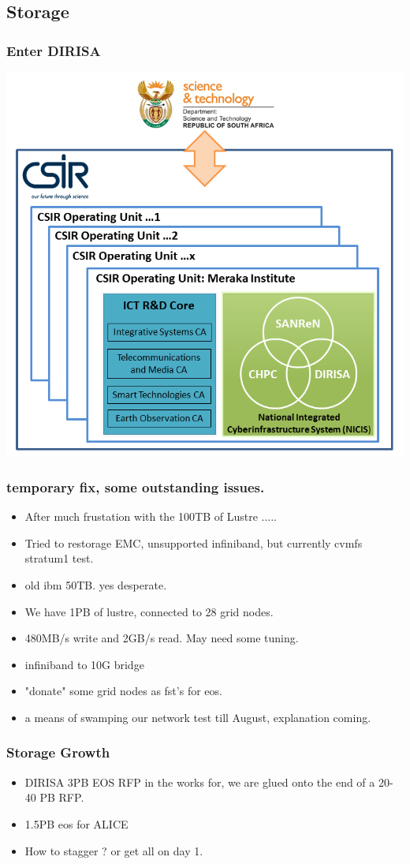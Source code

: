 \documentclass{beamer}
\begin{document}
\subsection{Storage}
\begin{frame}
    \frametitle{Enter DIRISA}
    \includegraphics[scale=0.45]{Where-does-SANReN-live2.png}
\end{frame}
\begin{frame}
    \frametitle{temporary fix, some outstanding issues.}
    \begin{itemize}
            \item After much frustation with the 100TB of Lustre .....
            \item Tried to restorage EMC, unsupported infiniband, but currently cvmfs stratum1 test.
                \item old ibm 50TB. yes desperate.
            \item We have 1PB of lustre, connected to 28 grid nodes.
            \item 480MB/s write and 2GB/s read. May need some tuning.
            \item infiniband to 10G bridge
            \item "donate" some grid nodes as fst's for eos.
            \item a means of swamping our network test till August, explanation coming.
    \end{itemize}
    \end{frame}
\begin{frame}
    \frametitle{Storage Growth}
    \begin{itemize}
            \item DIRISA 3PB EOS RFP in the works for, we are glued onto the end of a 20-40 PB RFP.
                \item 1.5PB eos for ALICE
                    \item How to stagger ? or get all on day 1.
    \end{itemize}
\end{frame}
\end{document}
